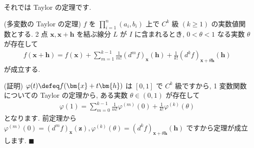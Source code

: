 \documentclass[openany, a4paper, oneside]{jsbook}
\begin{document}
それでは Taylor の定理です.
\begin{thm}
(多変数の Taylor の定理)
 $f$ を $\prod_{i=1}^n (a_i,b_i)$ 上で $C^k$ 級 $(k\geq 1)$ の実数値関数とする.
2 点 $\bm{x},\bm{x}+\bm{h}$ を結ぶ線分 $L$ が $I$ に含まれるとき,  $0<\theta<1$ なる実数 $\theta$ が存在して
    \begin{align}
        f (\bm{x}+\bm{h})
        =
        f (\bm{x}) + \sum_{m=1}^{k-1}\frac{1}{m!}(d^mf)_{\bm{x}}(\bm{h}) +
         \frac{1}{k!}(d^kf)_{\bm{x}+\theta \bm{h}}(\bm{h})
    \end{align}
が成立する.
\end{thm}
(証明) $\varphi (t)\defeq f (\bm{x}+t\bm{h})$ は $[0,1]$ で $C^k$ 級ですから, 1 変数関数についての
Taylor の定理から, ある実数 $\theta\in (0,1)$ が存在して
\begin{align}
    \varphi (1)
    =
    \sum_{m=0}^{k-1}\frac{1}{m!}\varphi^{(m)}(0) +\frac{1}{k!}\varphi^{(k)}(\theta)
\end{align}
となります. 前定理から $\varphi^{(m)}(0)=(d^mf)_{\bm{x}}(\bm{z}),\varphi^{(k)}(\theta)=(d^kf)_{\bm{x}+\theta\bm{h}}(\bm{h})$
ですから定理が成立します.  $\blacksquare$
\end{document}
